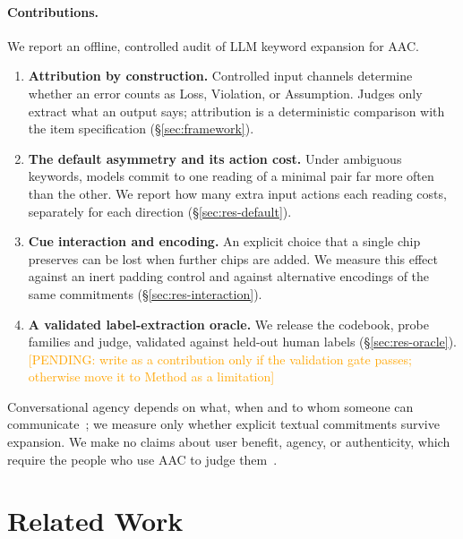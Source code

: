 \documentclass{ceurart}
\newcommand{\pending}[1]{\textcolor{orange}{[PENDING: #1]}}
\begin{document}
\paragraph{Contributions.}
We report an offline, controlled audit of LLM keyword expansion for AAC.
\begin{enumerate}
\item \textbf{Attribution by construction.} Controlled input channels determine whether an error counts as Loss, Violation, or Assumption. Judges only extract what an output says; attribution is a deterministic comparison with the item specification (\S\ref{sec:framework}).
\item \textbf{The default asymmetry and its action cost.} Under ambiguous keywords, models commit to one reading of a minimal pair far more often than the other. We report how many extra input actions each reading costs, separately for each direction (\S\ref{sec:res-default}). %
\item \textbf{Cue interaction and encoding.} An explicit choice that a single chip preserves can be lost when further chips are added. We measure this effect against an inert padding control and against alternative encodings of the same commitments (\S\ref{sec:res-interaction}). %
\item \textbf{A validated label-extraction oracle.} We release the codebook, probe families and judge, validated against held-out human labels (\S\ref{sec:res-oracle}). \pending{write as a contribution only if the validation gate passes; otherwise move it to Method as a limitation} %
\end{enumerate}
Conversational agency depends on what, when and to whom someone can communicate~\cite{valencia2020agency}; we measure only whether explicit textual commitments survive expansion. We make no claims about user benefit, agency, or authenticity, which require the people who use AAC to judge them~\cite{frisch2026complicated}.

\section{Related Work}
\end{document}
